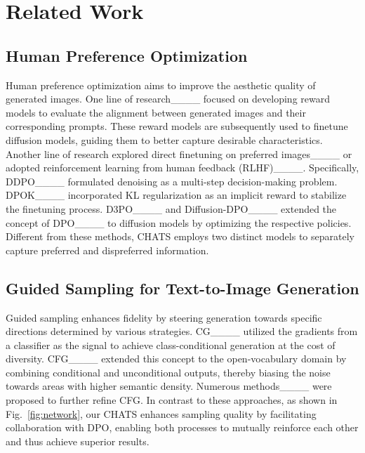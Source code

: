 \section{Related Work}
\subsection{Human Preference Optimization}

Human preference optimization aims to improve the aesthetic quality of generated images. One line of research____ focused on developing reward models to evaluate the alignment between generated images and their corresponding prompts. These reward models are subsequently used to finetune diffusion models, guiding them to better capture desirable characteristics. Another line of research explored direct finetuning on preferred images____ or adopted reinforcement learning from human feedback (RLHF)____. Specifically, DDPO____ formulated denoising as a multi-step decision-making problem. DPOK____ incorporated KL regularization as an implicit reward to stabilize the finetuning process. D3PO____ and Diffusion-DPO____ extended the concept of DPO____ to diffusion models by optimizing the respective policies. Different from these methods, CHATS employs two distinct models to separately capture preferred and dispreferred information.


\subsection{Guided Sampling for Text-to-Image Generation}

Guided sampling enhances fidelity by steering generation towards specific directions determined by various strategies. CG____ utilized the gradients from a classifier as the signal to achieve class-conditional generation at the cost of diversity. CFG____ extended this concept to the open-vocabulary domain by combining conditional and unconditional outputs, thereby biasing the noise towards areas with higher semantic density. Numerous methods____ were proposed to further refine CFG. In contrast to these approaches, as shown in Fig.~\ref{fig:network}, our CHATS enhances sampling quality by facilitating collaboration with DPO, enabling both processes to mutually reinforce each other and thus achieve superior results.